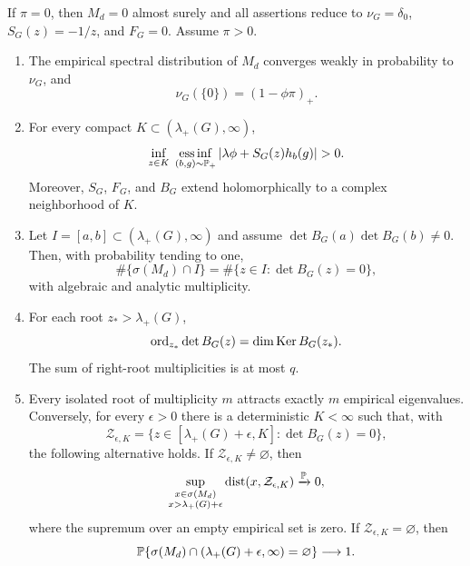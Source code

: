 \begin{theorem}
\label{S:main}
If $\pi=0$, then $M_d=0$ almost surely and all assertions reduce to
$\nu_G=\delta_0$, $S_G(z)=-1/z$, and $F_G=0$. Assume $\pi>0$.
\begin{enumerate}
\item The empirical spectral distribution of $M_d$ converges weakly in probability to $\nu_G$, and
\begin{equation}
\nu_G(\{0\})=(1-\phi\pi)_+.
\label{S:zeroatom}
\end{equation}

\item For every compact $K\subset(\lambda_+(G),\infty)$,
\begin{equation}
\inf_{z\in K}\;
\essinf_{(b,g)\sim\Pp_+}
\left|\lambda\phi+S_G(z)h_b(g)\right|>0.
\label{S:denominator}
\end{equation}
Moreover, $S_G$, $F_G$, and $B_G$ extend holomorphically to a complex
neighborhood of $K$.

\item Let $I=[a,b]\subset(\lambda_+(G),\infty)$ and assume
$\det B_G(a)\det B_G(b)\ne0$. Then, with probability tending to one,
\begin{equation}
\#\{\sigma(M_d)\cap I\}
=
\#\{z\in I:\det B_G(z)=0\},
\label{S:count}
\end{equation}
with algebraic and analytic multiplicity.

\item For each root $z_*>\lambda_+(G)$,
\begin{equation}
\operatorname{ord}_{z_*}\det B_G(z)=\dim\operatorname{Ker} B_G(z_*).
\label{S:multiplicity}
\end{equation}
The sum of right-root multiplicities is at most $q$.

\item Every isolated root of multiplicity $m$ attracts exactly $m$ empirical eigenvalues. Conversely, for every $\epsilon>0$ there is a deterministic $K<\infty$ such that, with
\begin{equation}
\mathcal Z_{\epsilon,K}
=
\{z\in[\lambda_+(G)+\epsilon,K]:\det B_G(z)=0\},
\end{equation}
the following alternative holds. If $\mathcal Z_{\epsilon,K}\ne\varnothing$, then
\begin{equation}
\sup_{\substack{x\in\sigma(M_d)\\x>\lambda_+(G)+\epsilon}}
\operatorname{dist}(x,\mathcal Z_{\epsilon,K})
\xrightarrow{\mathbb{P}}0,
\label{S:no-spurious}
\end{equation}
where the supremum over an empty empirical set is zero. If
$\mathcal Z_{\epsilon,K}=\varnothing$, then
\begin{equation}
\mathbb{P}\{\sigma(M_d)\cap(\lambda_+(G)+\epsilon,\infty)=\varnothing\}
\longrightarrow1.
\label{S:no-spurious-empty}
\end{equation}


\end{enumerate}
\end{theorem}
